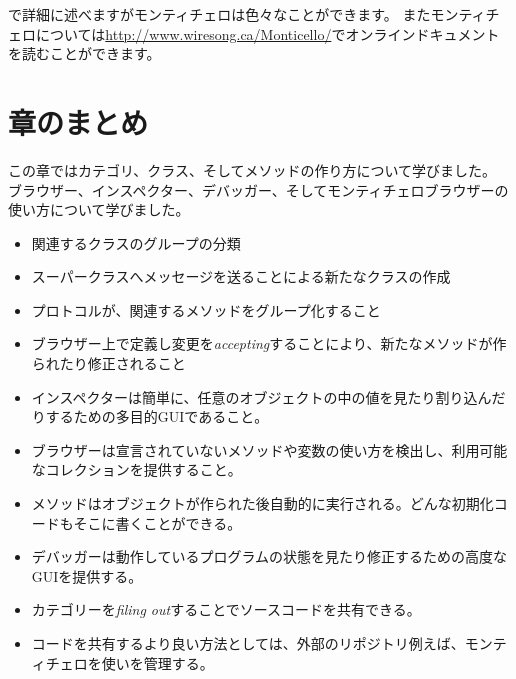 \documentclass[a4paper,10pt,twoside]{book}
\begin{document}

で詳細に述べますがモンティチェロは色々なことができます。
またモンティチェロについては\url{http://www.wiresong.ca/Monticello/}でオンラインドキュメントを読むことができます。

\section{章のまとめ}
この章ではカテゴリ、クラス、そしてメソッドの作り方について学びました。
ブラウザー、インスペクター、デバッガー、そしてモンティチェロブラウザーの使い方について学びました。

\begin{itemize}
  \item 関連するクラスのグループの分類
  \item スーパークラスへメッセージを送ることによる新たなクラスの作成
  \item プロトコルが、関連するメソッドをグループ化すること
  \item ブラウザー上で定義し変更を\emph{accepting}することにより、新たなメソッドが作られたり修正されること
  \item インスペクターは簡単に、任意のオブジェクトの中の値を見たり割り込んだりするための多目的GUIであること。
  \item ブラウザーは宣言されていないメソッドや変数の使い方を検出し、利用可能なコレクションを提供すること。
  \item {}メソッドはオブジェクトが作られた後自動的に実行される。どんな初期化コードもそこに書くことができる。
  \item デバッガーは動作しているプログラムの状態を見たり修正するための高度なGUIを提供する。
  \item カテゴリーを\emph{filing out}することでソースコードを共有できる。
  \item コードを共有するより良い方法としては、外部のリポジトリ例えば、モンティチェロを使いを管理する。
\end{itemize}

\ifx\wholebook\relax\else
\end{document}
